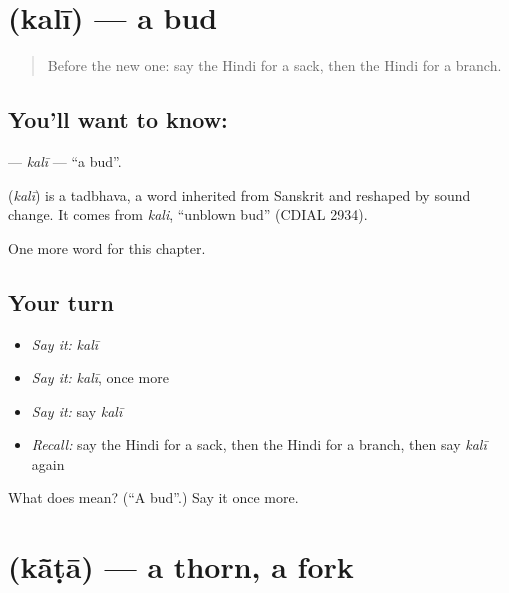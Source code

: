 \section[\texorpdfstring{\hi{कली} (kalī)}{कली (kalī)}]{ (kalī) — a bud}

\label{lesson:HI-C252-kali}



\begin{quote}
Before the new one: say the Hindi for a sack, then the Hindi for a branch.
\end{quote}

\subsection*{You'll want to know: }
\textbf{} — \emph{kalī} — \textquotedblleft{}a bud\textquotedblright{}.

\begin{cousinweb}
\textbf{} (\emph{kalī}) is a tadbhava, a word inherited from Sanskrit and reshaped by sound change. It comes from \emph{kali}, \textquotedblleft{}unblown bud\textquotedblright{} (CDIAL 2934).
\end{cousinweb}

\begin{grammarlens}[title={What you've built}]
One more word for this chapter.
\end{grammarlens}

\subsection*{Your turn}
\begin{itemize}
\raggedright
  \item \emph{Say it:} \emph{kalī}
  \item \emph{Say it:} \emph{kalī}, once more
  \item \emph{Say it:} say \emph{kalī}
  \item \emph{Recall:} say the Hindi for a sack, then the Hindi for a branch, then say \emph{kalī} again
\end{itemize}

\begin{tcolorbox}[breakable,colback=teal!4,colframe=teal!35!black,title={Before you move on}]
What does  mean? (\textquotedblleft{}A bud\textquotedblright{}.) Say it once more.
\end{tcolorbox}
\section[\texorpdfstring{\hi{काँटा} (kā̃ṭā)}{काँटा (kā̃ṭā)}]{ (kā̃ṭā) — a thorn, a fork}

